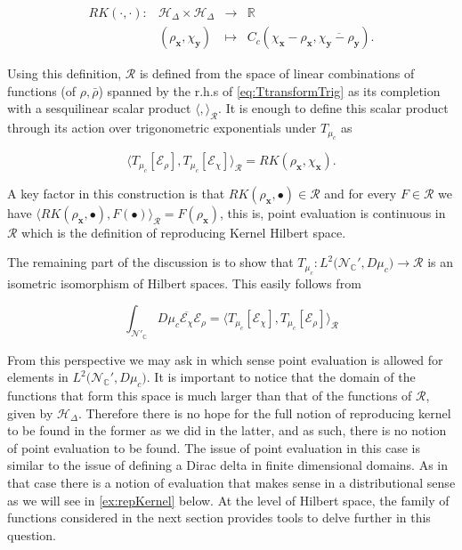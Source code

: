 \documentclass[12pt]{article}%
\begin{document}
\begin{equation}
    \label{eq:kernelforRKHS}
    \begin{array}{cccc}
    RK(\cdot,\cdot) :&\mathcal{H}_\Delta \times \mathcal{H}_\Delta & \longrightarrow & \mathbb{R} \\ 
     & (\rho_\mathbf{x},\chi_\mathbf{y}) &\longmapsto & C_c(\chi_{\mathbf{x}}-\rho_{\mathbf{x}},\overline{\chi_{\mathbf{y}}-\rho_{\mathbf{y}}}).
    \end{array}
    \end{equation}

    Using this definition, $\mathcal{R}$ is defined from the space of linear combinations of  functions (of $\rho,\bar\rho$) spanned by the r.h.s of \eqref{eq:TtransformTrig} as its completion with a sesquilinear scalar product $\langle,\rangle_{\mathcal{R}}$. It is enough to define this scalar product through its action over trigonometric exponentials under $T_{\mu_c}$ as

\begin{equation}
\label{eq:scalarProductCoherent}
\langle T_{\mu_c}[\mathcal{E}_{\rho}] , T_{\mu_c}[\mathcal{E}_{\chi}]\rangle_\mathcal{R}=RK(\rho_{\mathbf{x}},\chi_{\mathbf{x}}).
\end{equation}

A key factor in this construction is that $RK(\rho_{\mathbf{x}},\bullet )\in \mathcal{R}$ and for every $F\in \mathcal{R}$ we have  $\langle RK(\rho_{\mathbf{x}}, \bullet  ) , F(\bullet)\rangle_\mathcal{R}= F(\rho_{\mathbf{x}})$, this is, point evaluation is continuous in $\mathcal{R}$ which is the definition of reproducing Kernel Hilbert space.  

The remaining part of the discussion is to show that $T_{\mu_c}:L^2\big({\mathcal{N}_{\mathbb{C}}'},D\mu_c\big) \to \mathcal{R}$ is an isometric isomorphism of Hilbert spaces. This easily follows from 

\begin{equation}
\label{eq:ISometry}
\int_{\mathcal{N}'_\mathbb{C}}D\mu_c\overline{ \mathcal{E}_{\chi}} \mathcal{E}_{\rho}
=\langle T_{\mu_c}[\mathcal{E}_{\chi}] , T_{\mu_c}[\mathcal{E}_{\rho}]\rangle_\mathcal{R}
\end{equation}


From this perspective we may ask in which sense point evaluation is allowed for elements in $L^2\big({\mathcal{N}_{\mathbb{C}}'},D\mu_c\big)$. It is important to notice that the domain of the functions that form this space is much larger than that of the functions of $\mathcal{R}$, given by $\mathcal{H}_\Delta$. Therefore there is no hope for the full notion of reproducing kernel  to be found in the former as we did in the latter, and as such, there is no notion of point evaluation to be found. The issue of point evaluation in this case is similar to the issue of defining a Dirac 
delta in finite dimensional domains. As in that case there is a notion of evaluation that makes sense in a distributional sense as we will see in \autoref{ex:repKernel} below.  At the level of Hilbert space, the family of functions considered in the next section provides tools to delve further in this question.
\end{document}
